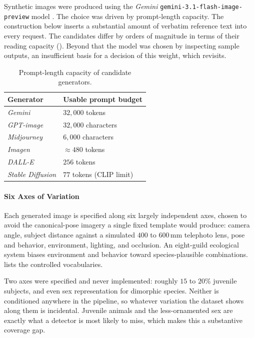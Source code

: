 Synthetic images were produced using the \textit{Gemini} \texttt{gemini-3.1-flash-image-preview} model \cite{GeminiAPI}. The choice was driven by prompt-length capacity. The construction below inserts a substantial amount of verbatim reference text into every request. The candidates differ by orders of magnitude in terms of their reading capacity (). Beyond that the model was chosen by inspecting sample outputs, an insufficient basis for a decision of this weight, which  revisits.

\begin{table}[htbp]
\centering
\caption{Prompt-length capacity of candidate generators.}
\label{tab:prompt-capacity}
\begin{tabular}{@{}ll@{}}
\toprule
Generator & Usable prompt budget \\
\midrule
\textit{Gemini} & $32{,}000$ tokens \\
\textit{GPT-image} & $32{,}000$ characters \\
\textit{Midjourney} & $6{,}000$ characters \\
\textit{Imagen} & $\approx 480$ tokens \\
\textit{DALL-E} & $256$ tokens \\
\textit{Stable Diffusion} & $77$ tokens (CLIP limit) \\
\bottomrule
\end{tabular}
\end{table}

\paragraph{Six Axes of Variation}
Each generated image is specified along six largely independent axes, chosen to avoid the canonical-pose imagery a single fixed template would produce: camera angle, subject distance against a simulated $400$ to $600\,\mathrm{mm}$ telephoto lens, pose and behavior, environment, lighting, and occlusion. An eight-guild ecological system biases environment and behavior toward species-plausible combinations.  lists the controlled vocabularies.

Two axes were specified and never implemented: roughly $15$ to $20\%$ juvenile subjects, and even sex representation for dimorphic species. Neither is conditioned anywhere in the pipeline, so whatever variation the dataset shows along them is incidental. Juvenile animals and the less-ornamented sex are exactly what a detector is most likely to miss, which makes this a substantive coverage gap.


